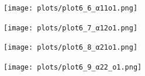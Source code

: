 \documentclass[12pt]{article} %
\numberwithin{equation}{section}  %
\begin{document}
\begin{figure}[ht!]
    \centering
    \begin{minipage}{0.48\textwidth}
        \centering
        \texttt{[image: plots/plot6\_6\_α11o1.png]}
    \end{minipage}
    \hfill
    \begin{minipage}{0.48\textwidth}
        \centering
        \texttt{[image: plots/plot6\_7\_α12o1.png]}
    \end{minipage}
    
    \vspace{1em} %
    
    \centering
    \begin{minipage}{0.48\textwidth}
        \centering
        \texttt{[image: plots/plot6\_8\_α21o1.png]}
    \end{minipage}
    \hfill
    \begin{minipage}{0.48\textwidth}
        \centering
        \texttt{[image: plots/plot6\_9\_α22\_o1.png]}
    \end{minipage}
    
    \caption{}
    \label{fig:A_est_o1}
\end{figure}
\end{document}
